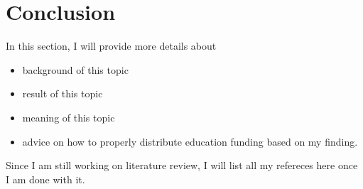 \documentclass[12pt,english]{article}
\begin{document}
\section{Conclusion}\label{sec:conclusion}
In this section, I will provide more details about
	     \begin{itemize} 
	           \item background of this topic
	           \item result of this topic
	           \item meaning of this topic
	           \item advice on how to properly distribute education funding based on my finding.
         \end{itemize}

\vfill
\pagebreak{}
\begin{spacing}{1.0}


\end{spacing}
Since I am still working on literature review, I will list all my refereces here once I am done with it.


\vfill
\pagebreak{}
\clearpage
\end{document}
